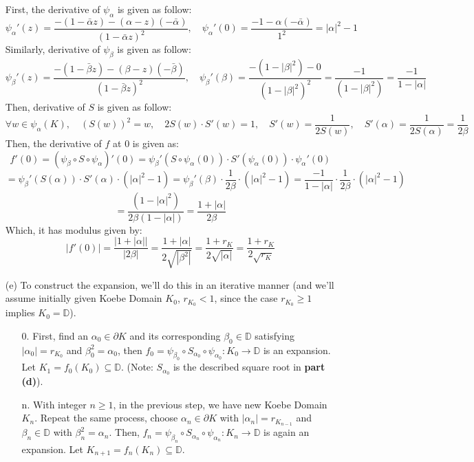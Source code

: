 \documentclass{article}
\begin{document}
\begin{itemize}
    First, the derivative of $\psi_\alpha$ is given as follow:
    $$\psi_\alpha'(z)=\frac{-(1-\bar{\alpha}z)-(\alpha-z)(-\bar{\alpha})}{(1-\bar{\alpha}z)^2},\quad \psi_\alpha'(0)=\frac{-1-\alpha(-\bar{\alpha})}{1^2}=|\alpha|^2-1$$
    Similarly, derivative of $\psi_\beta$ is given as follow:
    $$\psi_\beta'(z)=\frac{-(1-\bar{\beta}z)-(\beta-z)(-\bar{\beta})}{(1-\bar{\beta}z)^2},\quad \psi_\beta'(\beta)=\frac{-(1-|\beta|^2)-0}{(1-|\beta|^2)^2} = \frac{-1}{(1-|\beta|^2)}=\frac{-1}{1-|\alpha|}$$
    Then, derivative of $S$ is given as follow:
    $$\forall w\in \psi_\alpha(K),\quad (S(w))^2 = w,\quad 2S(w)\cdot S'(w)=1,\quad S'(w)=\frac{1}{2S(w)},\quad S'(\alpha)=\frac{1}{2S(\alpha)}=\frac{1}{2\beta}$$
    Then, the derivative of $f$ at $0$ is given as:
    $$f'(0)=(\psi_\beta\circ S\circ \psi_\alpha)'(0) = \psi_\beta'(S\circ \psi_\alpha(0))\cdot S'(\psi_\alpha(0))\cdot \psi_\alpha'(0)$$
    $$ = \psi_\beta'(S(\alpha))\cdot S'(\alpha)\cdot (|\alpha|^2-1) = \psi_\beta'(\beta)\cdot \frac{1}{2\beta}\cdot (|\alpha|^2-1) = \frac{-1}{1-|\alpha|}\cdot \frac{1}{2\beta}\cdot (|\alpha|^2-1)$$
    $$ = \frac{(1-|\alpha|^2)}{2\beta(1-|\alpha|)}=\frac{1+|\alpha|}{2\beta}$$
    Which, it has modulus given by:
    $$|f'(0)| = \frac{|1+|\alpha||}{|2\beta|} = \frac{1+|\alpha|}{2\sqrt{|\beta^2|}} = \frac{1+r_K}{2\sqrt{|\alpha|}}=\frac{1+r_K}{2\sqrt{r_K}}$$

    \hfil

    \item[(e)] To construct the expansion, we'll do this in an iterative manner (and we'll assume initially given Koebe Domain $K_0$, $r_{K_0}<1$, since the case $r_{K_0}\geq 1$ implies $K_0=\mathbb{D}$). 
    \begin{itemize}
        \item[0.] First, find an $\alpha_0\in \partial K$ and its corresponding $\beta_0\in \mathbb{D}$ satisfying $|\alpha_0|=r_{K_0}$ and $\beta_0^2=\alpha_0$, then $f_0=\psi_{\beta_0}\circ S_{\alpha_0}\circ \psi_{\alpha_0}:K_0\rightarrow\mathbb{D}$ is an expansion.
        Let $K_1=f_0(K_0)\subseteq \mathbb{D}$. (Note: $S_{\alpha_0}$ is the described square root in \textbf{part (d)}).

        \item[n.] With integer $n\geq 1$, in the previous step, we have new Koebe Domain $K_{n}$. Repeat the same process, choose $\alpha_n\in\partial K$ with $|\alpha_n|=r_{K_{n-1}}$ and $\beta_n\in\mathbb{D}$ with $\beta_n^2=\alpha_n$.
        Then, $f_n=\psi_{\beta_n}\circ S_{\alpha_n}\circ\psi_{\alpha_n}:K_n\rightarrow\mathbb{D}$ is again an expansion. Let $K_{n+1}=f_n(K_n)\subseteq\mathbb{D}$.
    \end{itemize}


\end{itemize}
\end{document}

